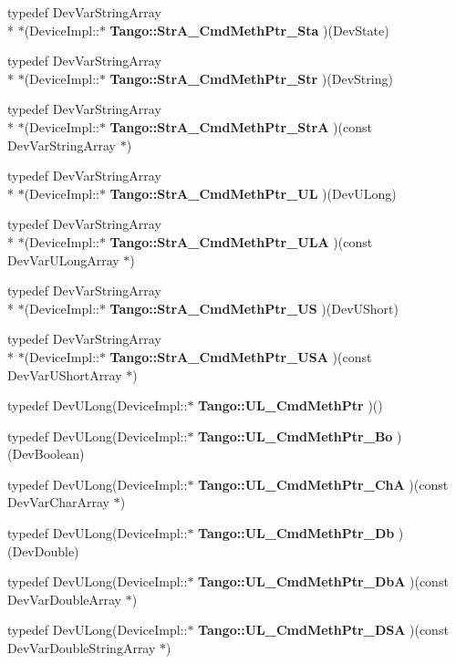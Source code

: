 \begin{DoxyCompactItemize}
\item 
typedef Dev\-Var\-String\-Array \\*
$\ast$(Device\-Impl\-::$\ast$ {\bf Tango\-::\-Str\-A\-\_\-\-Cmd\-Meth\-Ptr\-\_\-\-Sta} )(Dev\-State)
\item 
typedef Dev\-Var\-String\-Array \\*
$\ast$(Device\-Impl\-::$\ast$ {\bf Tango\-::\-Str\-A\-\_\-\-Cmd\-Meth\-Ptr\-\_\-\-Str} )(Dev\-String)
\item 
typedef Dev\-Var\-String\-Array \\*
$\ast$(Device\-Impl\-::$\ast$ {\bf Tango\-::\-Str\-A\-\_\-\-Cmd\-Meth\-Ptr\-\_\-\-Str\-A} )(const Dev\-Var\-String\-Array $\ast$)
\item 
typedef Dev\-Var\-String\-Array \\*
$\ast$(Device\-Impl\-::$\ast$ {\bf Tango\-::\-Str\-A\-\_\-\-Cmd\-Meth\-Ptr\-\_\-\-U\-L} )(Dev\-U\-Long)
\item 
typedef Dev\-Var\-String\-Array \\*
$\ast$(Device\-Impl\-::$\ast$ {\bf Tango\-::\-Str\-A\-\_\-\-Cmd\-Meth\-Ptr\-\_\-\-U\-L\-A} )(const Dev\-Var\-U\-Long\-Array $\ast$)
\item 
typedef Dev\-Var\-String\-Array \\*
$\ast$(Device\-Impl\-::$\ast$ {\bf Tango\-::\-Str\-A\-\_\-\-Cmd\-Meth\-Ptr\-\_\-\-U\-S} )(Dev\-U\-Short)
\item 
typedef Dev\-Var\-String\-Array \\*
$\ast$(Device\-Impl\-::$\ast$ {\bf Tango\-::\-Str\-A\-\_\-\-Cmd\-Meth\-Ptr\-\_\-\-U\-S\-A} )(const Dev\-Var\-U\-Short\-Array $\ast$)
\item 
typedef Dev\-U\-Long(Device\-Impl\-::$\ast$ {\bf Tango\-::\-U\-L\-\_\-\-Cmd\-Meth\-Ptr} )()
\item 
typedef Dev\-U\-Long(Device\-Impl\-::$\ast$ {\bf Tango\-::\-U\-L\-\_\-\-Cmd\-Meth\-Ptr\-\_\-\-Bo} )(Dev\-Boolean)
\item 
typedef Dev\-U\-Long(Device\-Impl\-::$\ast$ {\bf Tango\-::\-U\-L\-\_\-\-Cmd\-Meth\-Ptr\-\_\-\-Ch\-A} )(const Dev\-Var\-Char\-Array $\ast$)
\item 
typedef Dev\-U\-Long(Device\-Impl\-::$\ast$ {\bf Tango\-::\-U\-L\-\_\-\-Cmd\-Meth\-Ptr\-\_\-\-Db} )(Dev\-Double)
\item 
typedef Dev\-U\-Long(Device\-Impl\-::$\ast$ {\bf Tango\-::\-U\-L\-\_\-\-Cmd\-Meth\-Ptr\-\_\-\-Db\-A} )(const Dev\-Var\-Double\-Array $\ast$)
\item 
typedef Dev\-U\-Long(Device\-Impl\-::$\ast$ {\bf Tango\-::\-U\-L\-\_\-\-Cmd\-Meth\-Ptr\-\_\-\-D\-S\-A} )(const Dev\-Var\-Double\-String\-Array $\ast$)

\end{DoxyCompactItemize}
